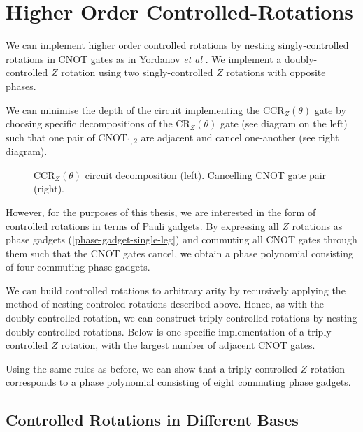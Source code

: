 \section{Higher Order Controlled-Rotations}

We can implement higher order controlled rotations by nesting singly-controlled rotations in CNOT gates as in Yordanov \textit{et al} \cite{Yordanov2020}. We implement a doubly-controlled $Z$ rotation using two singly-controlled $Z$ rotations with opposite phases.


We can minimise the depth of the circuit implementing the CCR$_Z(\theta)$ gate by choosing specific decompositions of the CR$_Z(\theta)$ gate (see diagram on the left) such that one pair of $\text{CNOT}_{1, 2}$ are adjacent and cancel one-another (see right diagram).

\begin{figure}[H]
    \centering
    \caption{CCR$_Z(\theta)$ circuit decomposition (left). Cancelling CNOT gate pair (right).}
\end{figure}

However, for the purposes of this thesis, we are interested in the form of controlled rotations in terms of Pauli gadgets. By expressing all $Z$ rotations as phase gadgets (\ref{phase-gadget-single-leg}) and commuting all CNOT gates through them such that the CNOT gates cancel, we obtain a phase polynomial consisting of four commuting phase gadgets.


We can build controlled rotations to arbitrary arity by recursively applying the method of nesting controled rotations described above. Hence, as with the doubly-controlled rotation, we can construct triply-controlled rotations by nesting doubly-controlled rotations. Below is one specific implementation of a triply-controlled $Z$ rotation, with the largest number of adjacent CNOT gates.


Using the same rules as before, we can show that a triply-controlled $Z$ rotation corresponds to a phase polynomial consisting of eight commuting phase gadgets.


\subsection{Controlled Rotations in Different Bases}

